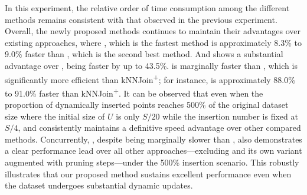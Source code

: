 In this experiment, the relative order of time consumption among the different methods remains consistent with that observed in the previous experiment. Overall, the newly proposed methods continues to maintain their advantages over existing approaches, where \cpdualtree, which is the fastest method is approximately 8.3\% to 9.0\% faster than \spdualtree, which is the second best method. And \spdualtree shows a substantial advantage over \deltatree, being faster by up to 43.5\%. \deltatree is marginally faster than \dualtree, which is significantly more efficient than kNNJoin\textsuperscript{+}; for instance, \dualtree is approximately 88.0\% to 91.0\% faster than kNNJoin\textsuperscript{+}. It can be observed that even when the proportion of dynamically inserted points reaches 500\% of the original dataset size where the initial size of $U$ is only $S/20$ while the insertion number is fixed at $S/4$, \cpdualtree and \spdualtree consistently maintains a definitive speed advantage over other compared methods. Concurrently, \dualtree, despite being marginally slower than \deltatree, also demonstrates a clear performance lead over all other approaches—excluding \deltatree and its own variant augmented with pruning steps—under the 500\% insertion scenario. This robustly illustrates that our proposed method sustains excellent performance even when the dataset undergoes substantial dynamic updates.

